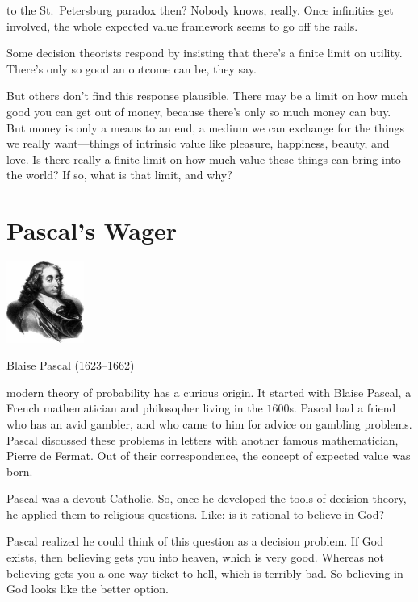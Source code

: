 \documentclass[justified]{tufte-book}
\theoremstyle{definition}
\theoremstyle{definition}
\theoremstyle{definition}
\theoremstyle{remark}
\begin{document}
 to the St.~Petersburg paradox
then? Nobody knows, really. Once infinities get involved, the whole
expected value framework seems to go off the rails.

Some decision theorists respond by insisting that there's a finite limit
on utility. There's only so good an outcome can be, they say.

But others don't find this response plausible. There may be a limit on
how much good you can get out of money, because there's only so much
money can buy. But money is only a means to an end, a medium we can
exchange for the things we really want---things of intrinsic value like
pleasure, happiness, beauty, and love. Is there really a finite limit on
how much value these things can bring into the world? If so, what is
that limit, and why?

\hypertarget{pascals-wager}{%
\section{Pascal's Wager}\label{pascals-wager}}

\begin{marginfigure}
\includegraphics[width=1in]{img/pascal} \caption[Blaise Pascal (1623--1662)]{Blaise Pascal (1623--1662)}\label{fig:unnamed-chunk-117}
\end{marginfigure}

 modern theory of probability has a curious origin. It
started with Blaise Pascal, a French mathematician and philosopher
living in the \(1600\)s. Pascal had a friend who has an avid gambler,
and who came to him for advice on gambling problems. Pascal discussed
these problems in letters with another famous mathematician, Pierre de
Fermat. Out of their correspondence, the concept of expected value was
born.

Pascal was a devout Catholic. So, once he developed the tools of
decision theory, he applied them to religious questions. Like: is it
rational to believe in God?

Pascal realized he could think of this question as a decision problem.
If God exists, then believing gets you into heaven, which is very good.
Whereas not believing gets you a one-way ticket to hell, which is
terribly bad. So believing in God looks like the better option.
\end{document}
